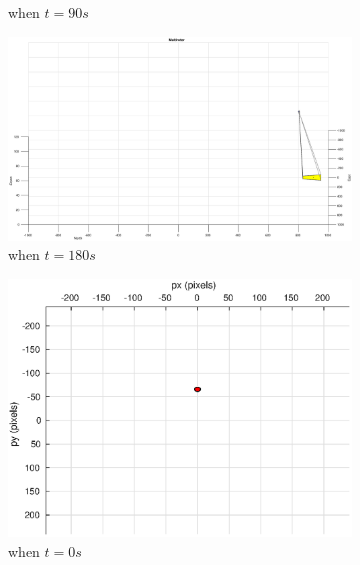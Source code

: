 \begin{figure}
\begin{subfigure}[b]{0.32\linewidth}
		\caption{when $t=90s$}
	\end{subfigure}
	\begin{subfigure}[b]{0.32\linewidth}
		\includegraphics[width=\textwidth]{images/chapter4/image_UAV_5mps_180s}
		\caption{when $t=180s$}
	\end{subfigure}
	\begin{subfigure}[b]{0.32\linewidth}
		\includegraphics[width=\textwidth]{images/chapter4/image_camera_5mps}
		\caption{when $t=0s$}
	\end{subfigure}
	\begin{subfigure}[b]{0.32\linewidth}

\end{subfigure}
\end{figure}
